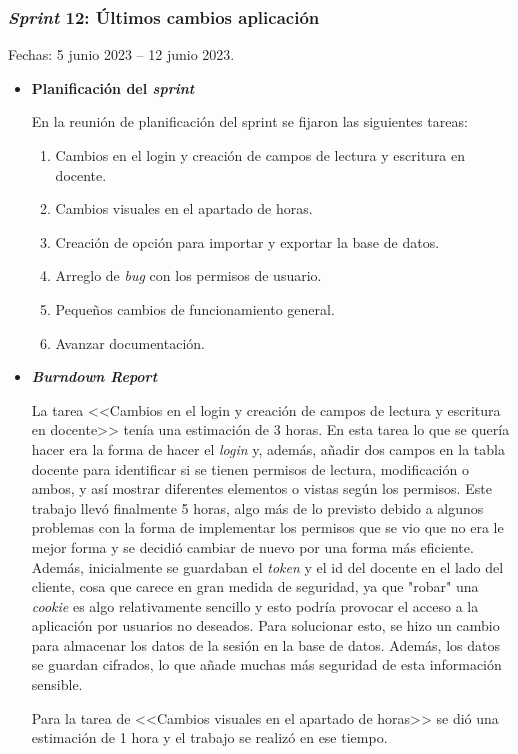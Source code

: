 \subsubsection{\textit{Sprint} 12: Últimos cambios aplicación}
Fechas: 5 junio 2023 -- 12 junio 2023.
\begin{itemize}
\item\textbf{Planificación del \textit{sprint}}

En la reunión de planificación del sprint se fijaron las siguientes tareas:
\begin{enumerate}
		\item Cambios en el login y creación de campos de lectura y escritura en docente.
		\item Cambios visuales en el apartado de horas.
		\item Creación de opción para importar y exportar la base de datos.
		\item Arreglo de \textit{bug} con los permisos de usuario.
		\item Pequeños cambios de funcionamiento general.
		\item Avanzar documentación.
\end{enumerate}

\item\textbf{\textit{Burndown Report}}

La tarea <<Cambios en el login y creación de campos de lectura y escritura en docente>> tenía una estimación de 3 horas.
En esta tarea lo que se quería hacer era la forma de hacer el \textit{login} y, además, añadir dos campos en la tabla docente para identificar si se tienen permisos de lectura, modificación o ambos, y así mostrar diferentes elementos o vistas según los permisos.
Este trabajo llevó finalmente 5 horas, algo más de lo previsto debido a algunos problemas con la forma de implementar los permisos que se vio que no era le mejor forma y se decidió cambiar de nuevo por una forma más eficiente.
Además, inicialmente se guardaban el \textit{token} y el id del docente en el lado del cliente, cosa que carece en gran medida de seguridad, ya que "robar" una \textit{cookie} es algo relativamente sencillo y esto podría provocar el acceso a la aplicación por usuarios no deseados.
Para solucionar esto, se hizo un cambio para almacenar los datos de la sesión en la base de datos. 
Además, los datos se guardan cifrados, lo que añade muchas más seguridad de esta información sensible.

Para la tarea de <<Cambios visuales en el apartado de horas>> se dió una estimación de 1 hora y el trabajo se realizó en ese tiempo.


\end{itemize}
